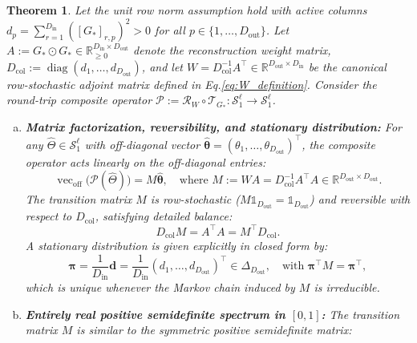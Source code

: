 \documentclass[default,sn-mathphys,Numbered]{sn-jnl}
\theoremstyle{thmstyleone}
\newtheorem{theorem}{Theorem}
\theoremstyle{thmstylethree}
\theoremstyle{thmstyletwo}
\newcommand{\inp}{\text{in}}
\newcommand{\outp}{\text{out}}
\newcommand{\diag}{\operatorname{diag}}
\newcommand{\eqnref}[1]{\eqref{#1}}
\begin{document}
\begin{theorem}
\label{th:roundtrip_contraction}
Let the unit row norm assumption hold with active columns $d_p = \sum_{r=1}^{D_{\inp}} ([G_*]_{r, p})^2 > 0$ for all $p \in \{1, \dots, D_{\outp}\}$. Let $A := G_* \odot G_* \in \mathbb{R}_{\ge 0}^{D_{\inp} \times D_{\outp}}$ denote the reconstruction weight matrix, $D_{\mathrm{col}} := \diag(d_1, \dots, d_{D_{\outp}})$, and let $W = D_{\mathrm{col}}^{-1} A^\top \in \mathbb{R}^{D_{\outp} \times D_{\inp}}$ be the canonical row-stochastic adjoint matrix defined in Eq.\eqnref{eq:W_definition}. Consider the round-trip composite operator $\mathcal{P} := \mathcal{R}_W \circ \mathcal{T}_{G_*} : \mathcal{S}_1^\ell \to \mathcal{S}_1^\ell$.
\begin{enumerate}[(a)]
    \item[(a)] \textbf{Matrix factorization, reversibility, and stationary distribution:} For any $\hat{\Theta} \in \mathcal{S}_1^\ell$ with off-diagonal vector $\hat{\bm{\theta}} = (\theta_1, \dots, \theta_{D_{\outp}})^\top$, the composite operator acts linearly on the off-diagonal entries:
    \begin{equation}
    \label{eq:roundtrip_matrix}
    \operatorname{vec}_{\mathrm{off}}\bigl(\mathcal{P}(\hat{\Theta})\bigr) = M \hat{\bm{\theta}}, \quad \text{where } M := W A = D_{\mathrm{col}}^{-1} A^\top A \in \mathbb{R}^{D_{\outp} \times D_{\outp}}.
    \end{equation}
    The transition matrix $M$ is row-stochastic ($M \mathds{1}_{D_{\outp}} = \mathds{1}_{D_{\outp}}$) and reversible with respect to $D_{\mathrm{col}}$, satisfying detailed balance:
    \begin{equation}
    \label{eq:detailed_balance}
    D_{\mathrm{col}} M = A^\top A = M^\top D_{\mathrm{col}}.
    \end{equation}
    A stationary distribution is given explicitly in closed form by:
    \begin{equation}
    \label{eq:stationary_pi}
    \bm{\pi} = \frac{1}{D_{\inp}} \bm{d} = \frac{1}{D_{\inp}} (d_1, \dots, d_{D_{\outp}})^\top \in \Delta_{D_{\outp}}, \quad \text{with } \bm{\pi}^\top M = \bm{\pi}^\top,
    \end{equation}
    which is unique whenever the Markov chain induced by $M$ is irreducible.
    \item[(b)] \textbf{Entirely real positive semidefinite spectrum in $[0, 1]$:} The transition matrix $M$ is similar to the symmetric positive semidefinite matrix:
    \begin{equation}

\end{equation}
\end{enumerate}
\end{theorem}
\end{document}
